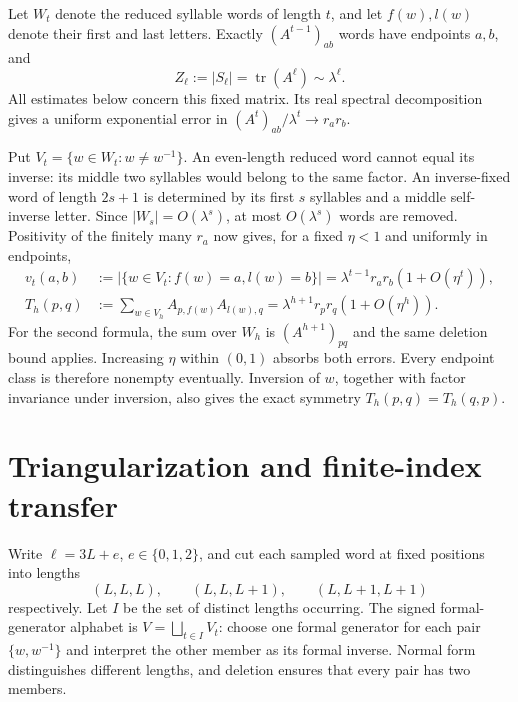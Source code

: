 \documentclass[11pt,letterpaper]{article}
\newcommand{\tr}{\operatorname{tr}}
\begin{document}
Let $W_t$ denote the reduced syllable words of length $t$, and let $f(w),l(w)$ denote their first and last letters. Exactly $(A^{t-1})_{ab}$ words have endpoints $a,b$, and
\begin{equation}\label{eq:Z}
 Z_\ell:=|S_\ell|=\tr(A^\ell)\sim\lambda^\ell.
\end{equation}
All estimates below concern this fixed matrix. Its real spectral decomposition gives a uniform exponential error in
$(A^t)_{ab}/\lambda^t\to r_a r_b$.

Put $V_t=\{w\in W_t:w\ne w^{-1}\}$. An even-length reduced word cannot equal its inverse: its middle two syllables would belong to the same factor. An inverse-fixed word of length $2s+1$ is determined by its first $s$ syllables and a middle self-inverse letter. Since $|W_s|=O(\lambda^s)$, at most $O(\lambda^s)$ words are removed. Positivity of the finitely many $r_a$ now gives, for a fixed $\eta<1$ and uniformly in endpoints,
\begin{align}
 v_t(a,b)&:=|\{w\in V_t:f(w)=a,l(w)=b\}|
   =\lambda^{t-1}r_a r_b(1+O(\eta^t)),\label{eq:v}\\
 T_h(p,q)&:=\sum_{w\in V_h} A_{p,f(w)}A_{l(w),q}
   =\lambda^{h+1}r_p r_q(1+O(\eta^h)).\label{eq:T}
\end{align}
For the second formula, the sum over $W_h$ is $(A^{h+1})_{pq}$ and the same deletion bound applies. Increasing $\eta$ within $(0,1)$ absorbs both errors. Every endpoint class is therefore nonempty eventually. Inversion of $w$, together with factor invariance under inversion, also gives the exact symmetry $T_h(p,q)=T_h(q,p)$.

\section{Triangularization and finite-index transfer}
Write $\ell=3L+e$, $e\in\{0,1,2\}$, and cut each sampled word at fixed positions into lengths
\begin{equation}\label{eq:blocks}
 (L,L,L),\qquad (L,L,L+1),\qquad (L,L+1,L+1)
\end{equation}
respectively. Let $I$ be the set of distinct lengths occurring. The signed formal-generator alphabet is $V=\bigsqcup_{t\in I}V_t$: choose one formal generator for each pair $\{w,w^{-1}\}$ and interpret the other member as its formal inverse. Normal form distinguishes different lengths, and deletion ensures that every pair has two members.
\end{document}
